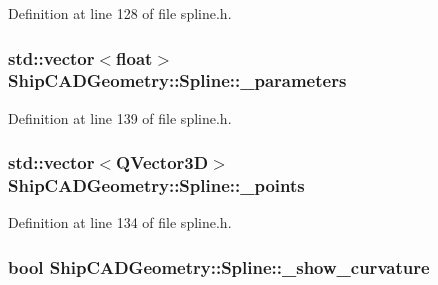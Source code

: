 Definition at line 128 of file spline.\-h.

\hypertarget{classShipCADGeometry_1_1Spline_a48f36b8eb159586aa334877f4ab7a015}{
\subsubsection[{\-\_\-parameters}]{\setlength{\rightskip}{0pt plus 5cm}std\-::vector$<$float$>$ Ship\-C\-A\-D\-Geometry\-::\-Spline\-::\-\_\-parameters\hspace{0.3cm}{\ttfamily [protected]}}}\label{classShipCADGeometry_1_1Spline_a48f36b8eb159586aa334877f4ab7a015}


Definition at line 139 of file spline.\-h.

\hypertarget{classShipCADGeometry_1_1Spline_ab6db595e6a4dd703838d5baec8543f34}{
\subsubsection[{\-\_\-points}]{\setlength{\rightskip}{0pt plus 5cm}std\-::vector$<$Q\-Vector3\-D$>$ Ship\-C\-A\-D\-Geometry\-::\-Spline\-::\-\_\-points\hspace{0.3cm}{\ttfamily [protected]}}}\label{classShipCADGeometry_1_1Spline_ab6db595e6a4dd703838d5baec8543f34}


Definition at line 134 of file spline.\-h.

\hypertarget{classShipCADGeometry_1_1Spline_aa3640f8d0561a651aec79a5d80c871f3}{
\subsubsection[{\-\_\-show\-\_\-curvature}]{\setlength{\rightskip}{0pt plus 5cm}bool Ship\-C\-A\-D\-Geometry\-::\-Spline\-::\-\_\-show\-\_\-curvature\hspace{0.3cm}{\ttfamily [protected]}}}\label{classShipCADGeometry_1_1Spline_aa3640f8d0561a651aec79a5d80c871f3}


